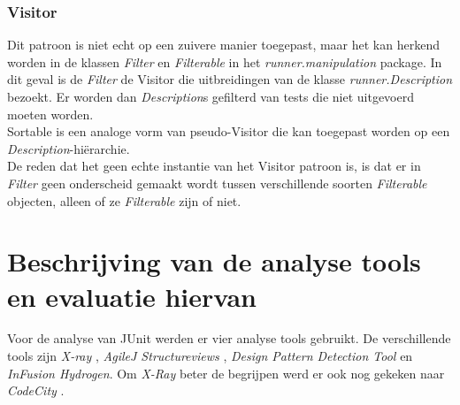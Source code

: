 \documentclass[i1]{oss}
\begin{document}
\subsubsection{Visitor}
Dit patroon is niet echt op een zuivere manier toegepast, maar het kan herkend worden in de klassen \emph{Filter} en \emph{Filterable} in het \emph{runner.manipulation} package. 
In dit geval is de \emph{Filter} de Visitor die uitbreidingen van de klasse \emph{runner.Description} bezoekt. 
Er worden dan \emph{Description}s gefilterd van tests die niet uitgevoerd moeten worden. 
\\
Sortable is een analoge vorm van pseudo-Visitor die kan toegepast worden op een \emph{Description}-hi\"erarchie.
\\
De reden dat het geen echte instantie van het Visitor patroon is, is dat er in \emph{Filter} geen onderscheid gemaakt wordt tussen verschillende soorten \emph{Filterable} objecten, alleen of ze \emph{Filterable} zijn of niet.


\section{Beschrijving van de analyse tools en evaluatie hiervan}

Voor de analyse van JUnit werden er vier analyse tools gebruikt. De verschillende tools zijn \emph{X-ray} \cite{X-Ray}, \emph{AgileJ Structureviews} \cite{AgileJ Structureviews} , \emph{Design Pattern Detection Tool} \cite{Design Pattern Detection Tool} en \emph{InFusion Hydrogen}. Om \emph{X-Ray} beter de begrijpen werd er ook nog gekeken naar \emph{CodeCity} \cite{CodeCity}.
\end{document}
